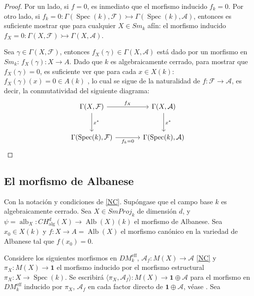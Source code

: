 \documentclass[10pt]{amsart}
\theoremstyle{definition}
\theoremstyle{remark}
\theoremstyle{definition}
\begin{document}
\begin{proof}
Por un lado, si $f=0$, es inmediato que el morfismo inducido $f_{k}=0$. Por otro lado, si $f_{k}=0:\Gamma(\operatorname{Spec}(k),\mathcal{F})\rightarrowtail\Gamma(\operatorname{Spec}(k),\mathcal{A})$, entonces es suficiente mostrar que para cualquier $X\in Sm_{k}$ afín: el morfismo inducido $f_{X}=0:\Gamma(X,\mathcal{F})\rightarrowtail\Gamma(X,\mathcal{A})$.


Sea $\gamma\in\Gamma(X,\mathcal{F})$, entonces $f_{X}(\gamma)\in\Gamma(X,\mathcal{A})$ está dado por un morfismo en $Sm_{k}$: $f_{X}(\gamma):X\to A$. Dado que $k$ es algebraicamente cerrado, para mostrar que $f_{X}(\gamma)=0$, es suficiente ver que para cada $x\in X(k)$: $f_{X}(\gamma)(x)=0\in A(k)$ \cite[Ch. II. Prop. 2.6]{Har77}, lo cual se sigue de la naturalidad de $f:\mathcal{F}\to\mathcal{A}$, es decir, la conmutatividad del siguiente diagrama:
\begingroup{}
\[
\begin{tikzcd}[column sep=large, row sep=large]
\Gamma(X,\mathcal{F}) \arrow[r,"f_{X}"] \arrow[d,"x^*"] &
\Gamma(X,\mathcal{A}) \arrow[d,"x^*"] \\
\Gamma(\operatorname{Spec}(k),\mathcal{F}) \arrow[r,"f_{k}=0"'] &
\Gamma(\operatorname{Spec}(k),\mathcal{A})
\end{tikzcd}
\]
\endgroup
\end{proof}

\subsection{El morfismo de Albanese}

Con la notación y condiciones de \ref{NC}. Supóngase que el campo base $k$ es algebraicamente cerrado. Sea $X\in SmProj_{k}$ de dimensión $d$, y $\psi=\operatorname{alb}_{X}:CH^{d}_{\operatorname{alg}}(X)\to\operatorname{Alb}(X)(k)$ el morfismo de Albanese. Sea $x_{0}\in X(k)$ y $f:X\to A=\operatorname{Alb}(X)$ el morfismo canónico en la variedad de Albanese tal que $f(x_{0})=0$.

Considere los siguientes morfismos en $DM^{\operatorname{eff}}_{k}$, $\mathcal{A}_{f}:M(X)\to\mathcal{A}$ \ref{NC} y $\pi_{X}:M(X)\to\mathbf{1}$ el morfismo inducido por el morfismo estructural $\pi_{X}:X\to\operatorname{Spec}(k)$. Se escribirá $\langle\pi_{X},\mathcal{A}_{f}\rangle:M(X)\to\mathbf{1}\oplus\mathcal{A}$ para el morfismo en $DM^{\operatorname{eff}}_{k}$ inducido por $\pi_{X}$, $\mathcal{A}_{f}$ en cada factor directo de $\mathbf{1}\oplus\mathcal{A}$, véase \cite[(7) en p.7, y Rmk. 3.3]{SS03}. Sea
\end{document}

